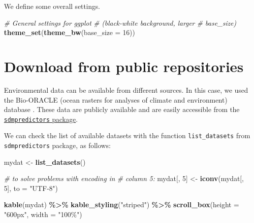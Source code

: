 \documentclass[
]{book}
\newenvironment{Shaded}{\begin{snugshade}}{\end{snugshade}}
\newcommand{\AttributeTok}[1]{\textcolor[rgb]{0.13,0.29,0.53}{#1}}
\newcommand{\CommentTok}[1]{\textcolor[rgb]{0.56,0.35,0.01}{\textit{#1}}}
\newcommand{\DecValTok}[1]{\textcolor[rgb]{0.00,0.00,0.81}{#1}}
\newcommand{\FunctionTok}[1]{\textcolor[rgb]{0.13,0.29,0.53}{\textbf{#1}}}
\newcommand{\NormalTok}[1]{#1}
\newcommand{\OtherTok}[1]{\textcolor[rgb]{0.56,0.35,0.01}{#1}}
\newcommand{\SpecialCharTok}[1]{\textcolor[rgb]{0.81,0.36,0.00}{\textbf{#1}}}
\newcommand{\StringTok}[1]{\textcolor[rgb]{0.31,0.60,0.02}{#1}}
\begin{document}
We define some overall settings.

\begin{Shaded}
\begin{Highlighting}[]
\CommentTok{\# General settings for ggplot}
\CommentTok{\# (black{-}white background, larger}
\CommentTok{\# base\_size)}
\FunctionTok{theme\_set}\NormalTok{(}\FunctionTok{theme\_bw}\NormalTok{(}\AttributeTok{base\_size =} \DecValTok{16}\NormalTok{))}
\end{Highlighting}
\end{Shaded}

\section{Download from public repositories}\label{download-from-public-repositories}

Environmental data can be available from different sources. In this case, we used the Bio-ORACLE (ocean
rasters for analyses of climate and environment) database \citep{tyberghein_etal_2012, assis_etal_2017}. These data are publicly available and are easily accessible from the \href{https://cran.r-project.org/web/packages/sdmpredictors/index.html}{\texttt{sdmpredictors} package}.

We can check the list of available datasets with the function \texttt{list\_datasets} from \texttt{sdmpredictors} package, as follows:

\begin{Shaded}
\begin{Highlighting}[]
\NormalTok{mydat }\OtherTok{\textless{}{-}} \FunctionTok{list\_datasets}\NormalTok{()}

\CommentTok{\# to solve problems with encoding in}
\CommentTok{\# column 5:}
\NormalTok{mydat[, }\DecValTok{5}\NormalTok{] }\OtherTok{\textless{}{-}} \FunctionTok{iconv}\NormalTok{(mydat[, }\DecValTok{5}\NormalTok{], }\AttributeTok{to =} \StringTok{"UTF{-}8"}\NormalTok{)}

\FunctionTok{kable}\NormalTok{(mydat) }\SpecialCharTok{\%\textgreater{}\%}
    \FunctionTok{kable\_styling}\NormalTok{(}\StringTok{"striped"}\NormalTok{) }\SpecialCharTok{\%\textgreater{}\%}
    \FunctionTok{scroll\_box}\NormalTok{(}\AttributeTok{height =} \StringTok{"600px"}\NormalTok{, }\AttributeTok{width =} \StringTok{"100\%"}\NormalTok{)}
\end{Highlighting}
\end{Shaded}
\end{document}
